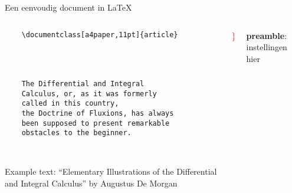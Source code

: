 \copyrightTim

\begin{frame}[fragile, t]{Een eenvoudig document in \LaTeX}
	\begin{columns}[t]
        \begin{column}{0.5\textwidth}
			\vspace{-20pt}
	\begin{verbatim} 
	\documentclass[a4paper,11pt]{article}

		
	

	The Differential and Integral 
	Calculus, or, as it was formerly 
	called in this country, 
	the Doctrine of Fluxions, has always 
	been supposed to present remarkable 
	obstacles to the beginner.

	
	\end{verbatim}

	{\tiny
	Example text: ``Elementary Illustrations of the Differential and Integral Calculus''
	by Augustus De Morgan
	\par}
\end{column}
\begin{column}{0.05\textwidth}
	\vspace{0pt}

	{\Huge \textcolor{red}{ \} } }
	\\[1.5cm]
	\phantom{{\Huge \textcolor{red}{ \} } }}
	
\end{column}
\begin{column}{0.4\textwidth}
	\vspace{0pt}
	
	\textbf{preamble}: instellingen hier
	\\[1.5cm]
\end{column}
\end{columns}

\end{frame}
